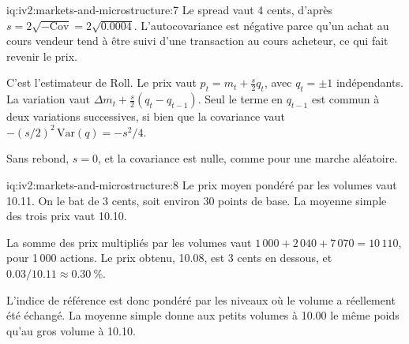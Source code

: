 \begin{solution}{iq:iv2:markets-and-microstructure:7}
Le spread vaut 4 cents, d'après $s = 2\sqrt{-\mathrm{Cov}} = 2\sqrt{0.0004}$. L'autocovariance est négative parce qu'un achat au cours vendeur tend à être suivi d'une transaction au cours acheteur, ce qui fait revenir le prix.

C'est l'estimateur de Roll. Le prix vaut $p_t = m_t + \tfrac{s}{2}q_t$, avec $q_t = \pm1$ indépendants. La variation vaut $\Delta m_t + \tfrac{s}{2}(q_t - q_{t-1})$. Seul le terme en $q_{t-1}$ est commun à deux variations successives, si bien que la covariance vaut $-(s/2)^2\,\mathrm{Var}(q) = -s^2/4$.

Sans rebond, $s = 0$, et la covariance est nulle, comme pour une marche aléatoire.

\end{solution}

\begin{solution}{iq:iv2:markets-and-microstructure:8}
Le prix moyen pondéré par les volumes vaut 10.11. On le bat de 3 cents, soit environ 30 points de base. La moyenne simple des trois prix vaut 10.10.

La somme des prix multipliés par les volumes vaut $1\,000 + 2\,040 + 7\,070 = 10\,110$, pour 1\,000 actions. Le prix obtenu, 10.08, est 3 cents en dessous, et $0.03/10.11 \approx 0.30~\%$.

L'indice de référence est donc pondéré par les niveaux où le volume a réellement été échangé. La moyenne simple donne aux petits volumes à 10.00 le même poids qu'au gros volume à 10.10.

\end{solution}

